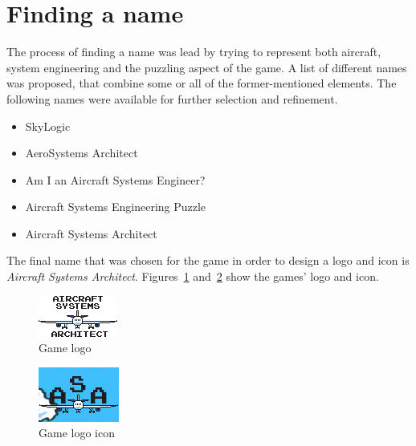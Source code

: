 \section{Finding a name}\label{sec:finding-a-name}
The process of finding a name was lead by trying to represent both aircraft, system engineering and the puzzling aspect of the game.
A list of different names was proposed, that combine some or all of the former-mentioned elements.
The following names were available for further selection and refinement.
\begin{itemize}
    \item SkyLogic
    \item AeroSystems Architect
    \item Am I an Aircraft Systems Engineer?
    \item Aircraft Systems Engineering Puzzle
    \item Aircraft Systems Architect
\end{itemize}
The final name that was chosen for the game in order to design a logo and icon is \textit{Aircraft Systems Architect}.
Figures~\ref{fig:logo} and~\ref{fig:logo-icon} show the games' logo and icon.
\begin{figure}
    \centering
    \includegraphics[width=\textwidth]{Pictures/res/concept/aircraft-systems-architect-logo}
    \caption{Game logo}
    \label{fig:logo}
\end{figure}
\begin{figure}
    \centering
    \includegraphics[width=\textwidth]{Pictures/res/concept/asa-logo}
    \caption{Game logo icon}
    \label{fig:logo-icon}
\end{figure}

